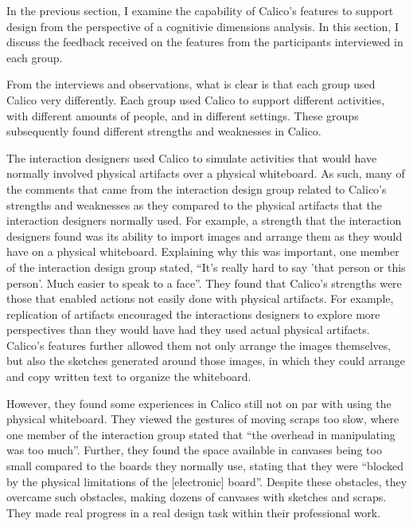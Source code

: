 In the previous section, I examine the capability of Calico's features to support design from the perspective of a cognitivie dimensions analysis. In this section, I discuss the feedback received on the features from the participants interviewed in each group.

From the interviews and observations, what is clear is that each group used Calico very differently. Each group used Calico to support different activities, with different amounts of people, and in different settings. These groups subsequently found different strengths and weaknesses in Calico.

The interaction designers used Calico to simulate activities that would have normally involved physical artifacts over a physical whiteboard. As such, many of the comments that came from the interaction design group related to Calico's strengths and weaknesses as they compared to the physical artifacts that the interaction designers normally used. For example, a strength that the interaction designers found was its ability to import images and arrange them as they would have on a physical whiteboard. Explaining why this was important, one member of the interaction design group stated, ``It's really hard to say 'that person or this person'. Much easier to speak to a face''. They found that Calico's strengths were those that enabled actions not easily done with physical artifacts. For example, replication of artifacts encouraged the interactions designers to explore more perspectives than they would have had they used actual physical artifacts. Calico's features further allowed them not only arrange the images themselves, but also the sketches generated around those images, in which they could arrange and copy written text to organize the whiteboard. 

However, they found some experiences in Calico still not on par with using the physical whiteboard. They viewed the gestures of moving scraps too slow, where one member of the interaction group stated that ``the overhead in manipulating was too much''. Further, they found the space available in canvases being too small compared to the boards they normally use, stating that they were ``blocked by the physical limitations of the [electronic] board''. Despite these obstacles, they overcame such obstacles, making dozens of canvases with sketches and scraps. They made real progress in a real design task within their professional work.

